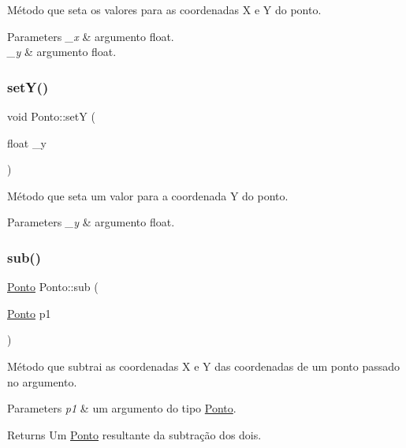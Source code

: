 Método que seta os valores para as coordenadas X e Y do ponto. 


\begin{DoxyParams}{Parameters}
{\em \+\_\+x} & argumento float. \\
\hline
{\em \+\_\+y} & argumento float. \\
\hline
\end{DoxyParams}
\mbox{\label{classPonto_a2d9e5b9fade9d3f3f21122a2dc2f5e11}} 
\subsubsection{\texorpdfstring{set\+Y()}{setY()}}
{\footnotesize\ttfamily void Ponto\+::setY (\begin{DoxyParamCaption}\item[{float}]{\+\_\+y }\end{DoxyParamCaption})\hspace{0.3cm}{\ttfamily [inline]}}



Método que seta um valor para a coordenada Y do ponto. 


\begin{DoxyParams}{Parameters}
{\em \+\_\+y} & argumento float. \\
\hline
\end{DoxyParams}
\mbox{\label{classPonto_a8404fcad0fca2ce768ab9e1550f5d3a0}} 
\subsubsection{\texorpdfstring{sub()}{sub()}}
{\footnotesize\ttfamily \mbox{\hyperlink{classPonto}{Ponto}} Ponto\+::sub (\begin{DoxyParamCaption}\item[{\mbox{\hyperlink{classPonto}{Ponto}}}]{p1 }\end{DoxyParamCaption})\hspace{0.3cm}{\ttfamily [inline]}}



Método que subtrai as coordenadas X e Y das coordenadas de um ponto passado no argumento. 


\begin{DoxyParams}{Parameters}
{\em p1} & um argumento do tipo \mbox{\hyperlink{classPonto}{Ponto}}. \\
\hline
\end{DoxyParams}
\begin{DoxyReturn}{Returns}
Um \mbox{\hyperlink{classPonto}{Ponto}} resultante da subtração dos dois. 
\end{DoxyReturn}
\mbox{\label{classPonto_a96a4395204ec010814e67d20705e630f}} 
